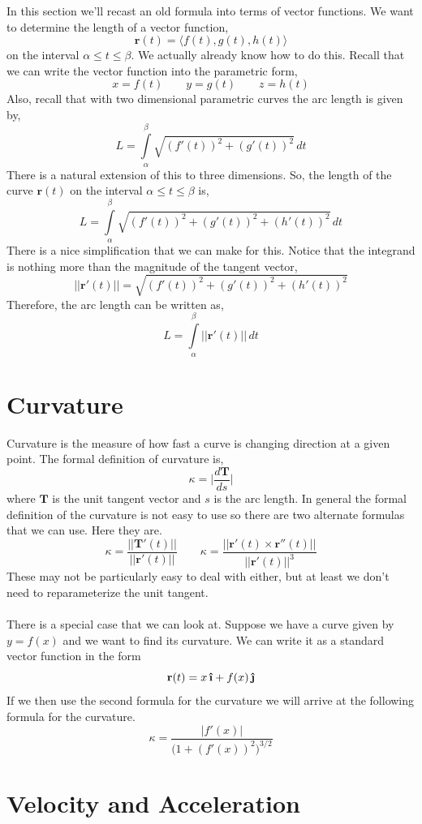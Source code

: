 \documentclass[10pt,reqno]{book}
\theoremstyle{definition}
\renewcommand{\vec}[1]{\mathbf{#1}}
\newcommand{\uvec}[1]{\boldsymbol{\hat{\textbf{#1}}}}
\begin{document}
	In this section we'll recast an old formula into terms of vector functions. We want to determine the length of a vector function,
	\[ \vec{r}(t) = \langle f(t),g(t),h(t) \rangle \]
	on the interval $ \alpha \leq t \leq \beta $. We actually already know how to do this. Recall that we can write the vector function into the parametric form,
	\[ x = f(t) \qquad y = g(t) \qquad z = h(t) \]
	Also, recall that with two dimensional parametric curves the arc length is given by,
	\[ L = \int\limits_{\alpha}^{\beta} \sqrt{(f'(t))^2 + (g'(t))^2 }\,dt \]
	There is a natural extension of this to three dimensions.  So, the length of the curve $ \vec{r}(t) $ on the interval $ \alpha \leq t \leq \beta $ is,
	\[ L = \int\limits_{\alpha}^{\beta} \sqrt{(f'(t))^2 + (g'(t))^2 + (h'(t))^2}\,dt \]
	There is a nice simplification that we can make for this. Notice that the integrand is nothing more than the magnitude of the tangent vector,
	\[ || \vec{r}'(t) || = \sqrt{(f'(t))^2 + (g'(t))^2 + (h'(t))^2} \]
	Therefore, the arc length can be written as,
	\[ L = \int\limits_{\alpha}^{\beta} || \vec{r}'(t)||\,dt \]
	
	
	\section{Curvature}
	
	Curvature is the measure of how fast a curve is changing direction at a given point. The formal definition of curvature is,
	\[ \kappa = \bigg\lvert \frac{d\vec{T}}{ds} \bigg\rvert \]
	where $ \vec{T} $ is the unit tangent vector and $ s $ is the arc length. In general the formal definition of the curvature is not easy to use so there are two alternate formulas that we can use.  Here they are.
	\[ \kappa = \frac{||\vec{T}'(t)||}{||\vec{r}'(t)||} \qquad \kappa = \frac{||\vec{r}'(t) \times \vec{r}''(t)||}{|| \vec{r}'(t) ||^3} \]
	These may not be particularly easy to deal with either, but at least we don’t need to reparameterize the unit tangent.\\ \\
	There is a special case that we can look at. Suppose we have a curve given by $ y = f(x) $ and we want to find its curvature. We can write it as a standard vector function in the form
	\[ \vec{r}(t) = x\,\uvec{\i} + f(x)\,\uvec{\j} \]
	If we then use the second formula for the curvature we will arrive at the following formula for the curvature.
	\[ \kappa = \frac{\big|f'(x)\big|}{\big( 1 + (f'(x))^2 \big)^{3/2}} \]
	
	\section{Velocity and Acceleration}
	
\end{document}
